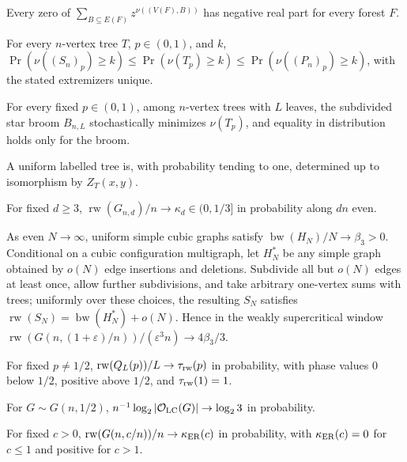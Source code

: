 \begin{conjecture}\label{as7}
Every zero of $\sum_{B\subseteq E(F)}z^{\nu((V(F),B))}$ has negative real
part for every forest $F$.
\end{conjecture}
\begin{conjecture}\label{as8}
For every $n$-vertex tree $T$, $p\in(0,1)$, and $k$,
$\Pr(\nu((S_n)_p)\ge k)\le\Pr(\nu(T_p)\ge k)\le
\Pr(\nu((P_n)_p)\ge k)$, with the stated extremizers unique.
\end{conjecture}
\begin{conjecture}\label{as9}
For every fixed $p\in(0,1)$, among $n$-vertex trees with $L$ leaves, the
subdivided star broom $B_{n,L}$ stochastically minimizes $\nu(T_p)$, and
equality in distribution holds only for the broom.
\end{conjecture}
\begin{conjecture}\label{as10}
A uniform labelled tree is, with probability tending to one, determined up
to isomorphism by $Z_T(x,y)$.
\end{conjecture}
\begin{conjecture}\label{as11}
For fixed $d\ge3$, $\operatorname{rw}(G_{n,d})/n\to\kappa_d\in(0,1/3]$ in
probability along $dn$ even.
\end{conjecture}
\begin{conjecture}\label{as12}
As even $N\to\infty$, uniform simple cubic graphs satisfy
$\operatorname{bw}(H_N)/N\to\beta_3>0$.  Conditional on a cubic
configuration multigraph, let $H_N^*$ be any simple graph obtained by
$o(N)$ edge insertions and deletions.  Subdivide all but $o(N)$ edges at
least once, allow further subdivisions, and take arbitrary one-vertex sums
with trees; uniformly over these choices, the resulting $S_N$ satisfies
$\operatorname{rw}(S_N)=\operatorname{bw}(H_N^*)+o(N)$.  Hence in the
weakly supercritical window
$\operatorname{rw}(G(n,(1+\varepsilon)/n))/(\varepsilon^3n)\to4\beta_3/3$.
\end{conjecture}
\begin{conjecture}\label{as13}
For fixed $p\ne1/2$, $\operatorname{rw}(Q_L(p))/L\to\tau_{\rm rw}(p)$ in
probability, with phase values $0$ below $1/2$, positive above $1/2$, and
$\tau_{\rm rw}(1)=1$.
\end{conjecture}
\begin{conjecture}\label{as14}
For $G\sim G(n,1/2)$,
$n^{-1}\log_2|\mathcal O_{\rm LC}(G)|\to\log_2 3$ in probability.
\end{conjecture}
\begin{conjecture}\label{as15}
For fixed $c>0$, $\operatorname{rw}(G(n,c/n))/n\to\kappa_{\rm ER}(c)$ in
probability, with $\kappa_{\rm ER}(c)=0$ for $c\le1$ and positive for
$c>1$.
\end{conjecture}

